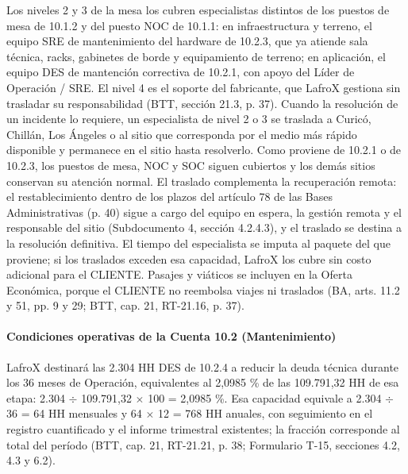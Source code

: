 Los niveles 2 y 3 de la mesa los cubren especialistas distintos de los puestos de mesa de 10.1.2 y del puesto NOC de 10.1.1: en infraestructura y terreno, el equipo SRE de mantenimiento del hardware de 10.2.3, que ya atiende sala técnica, racks, gabinetes de borde y equipamiento de terreno; en aplicación, el equipo DES de mantención correctiva de 10.2.1, con apoyo del Líder de Operación / SRE. El nivel 4 es el soporte del fabricante, que LafroX gestiona sin trasladar su responsabilidad (BTT, sección 21.3, p. 37). Cuando la resolución de un incidente lo requiere, un especialista de nivel 2 o 3 se traslada a Curicó, Chillán, Los Ángeles o al sitio que corresponda por el medio más rápido disponible y permanece en el sitio hasta resolverlo. Como proviene de 10.2.1 o de 10.2.3, los puestos de mesa, NOC y SOC siguen cubiertos y los demás sitios conservan su atención normal. El traslado complementa la recuperación remota: el restablecimiento dentro de los plazos del artículo 78 de las Bases Administrativas (p. 40) sigue a cargo del equipo en espera, la gestión remota y el responsable del sitio (Subdocumento 4, sección 4.2.4.3), y el traslado se destina a la resolución definitiva. El tiempo del especialista se imputa al paquete del que proviene; si los traslados exceden esa capacidad, LafroX los cubre sin costo adicional para el CLIENTE. Pasajes y viáticos se incluyen en la Oferta Económica, porque el CLIENTE no reembolsa viajes ni traslados (BA, arts. 11.2 y 51, pp. 9 y 29; BTT, cap. 21, RT-21.16, p. 37).

\paragraph{Condiciones operativas de la Cuenta 10.2 (Mantenimiento)}
LafroX destinará las 2.304 HH DES de 10.2.4 a reducir la deuda técnica durante los 36 meses de Operación, equivalentes al 2,0985 \% de las 109.791,32 HH de esa etapa: 2.304 \ensuremath{\div} 109.791,32 \ensuremath{\times} 100 = 2,0985 \%. Esa capacidad equivale a 2.304 \ensuremath{\div} 36 = 64 HH mensuales y 64 \ensuremath{\times} 12 = 768 HH anuales, con seguimiento en el registro cuantificado y el informe trimestral existentes; la fracción corresponde al total del período (BTT, cap. 21, RT-21.21, p. 38; Formulario T-15, secciones 4.2, 4.3 y 6.2).

